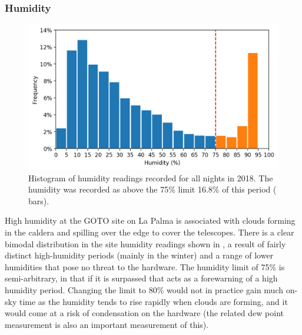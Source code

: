 \begin{colsection}
\newpage

\subsubsection{Humidity}

\begin{figure}[t]
    \begin{center}
        \includegraphics[width=\linewidth]{images/conditions/humidity.png}
    \end{center}
    \caption[Histogram of humidity readings]{
        Histogram of humidity readings recorded for all nights in 2018. The humidity was recorded as above the 75\% limit 16.8\% of this period ( bars).
    }\label{fig:humidity}
\end{figure}

\end{colsection}

High humidity at the GOTO site on La Palma is associated with clouds forming in the caldera and spilling over the edge to cover the telescopes. There is a clear bimodal distribution in the site humidity readings shown in , a result of fairly distinct high-humidity periods (mainly in the winter) and a range of lower humidities that pose no threat to the hardware. The humidity limit of 75\% is semi-arbitrary, in that if it is surpassed that acts as a forewarning of a high humidity period. Changing the limit to 80\% would not in practice gain much on-sky time as the humidity tends to rise rapidly when clouds are forming, and it would come at a risk of condensation on the hardware (the related dew point measurement is also an important measurement of this).

\newpage

